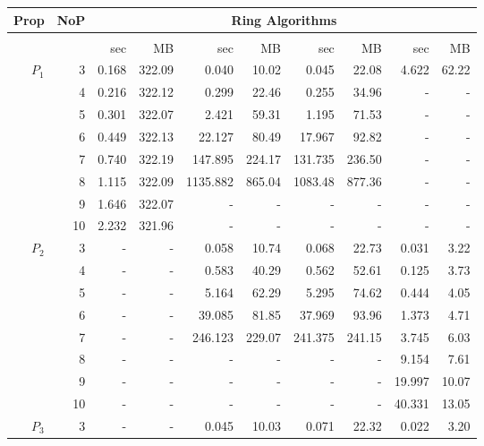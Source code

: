 \begin{figure}[h!]\scriptsize
	\centering
	\setlength{\tabcolsep}{2pt}
	\begin{tabular}{| r | r | r | r | r | r | r | r | r | r |}
		\hline
		\textbf{Prop} & \textbf{NoP} & \multicolumn{8}{c|}{Ring Algorithms} \\
		\hline
		{} & {} & \multicolumn{2}{c|}{\verds{}} & \multicolumn{2}{c|}{\nusmv{}} & \multicolumn{2}{c|}{\nuxmv{}} &  \multicolumn{2}{c|}{\sctl{}} \\
		\hline
		{} & {} & sec & MB & sec & MB & sec & MB & sec & MB \\
		\hline
		\multirow{6}{*}{$P_1$} & 3 & 0.168 & 322.09 & 0.040 & 10.02 & 0.045 & 22.08 & 4.622 & 62.22  \\
		{} & 4 & 0.216 & 322.12 & 0.299 & 22.46 & 0.255 & 34.96 & - & -  \\
		{} & 5 & 0.301 & 322.07 & 2.421 & 59.31 & 1.195 & 71.53 & - & -  \\
		{} & 6 & 0.449 & 322.13 & 22.127 & 80.49 & 17.967 & 92.82 & - & -  \\
		{} & 7 & 0.740 & 322.19 & 147.895 & 224.17 & 131.735 & 236.50 & - & -  \\
		{} & 8 & 1.115 & 322.09 & 1135.882 & 865.04 & 1083.48 & 877.36 & - & -  \\
		{} & 9 & 1.646 & 322.07 & - & - & - & - & - & -  \\
		{} & 10 & 2.232 & 321.96 & - & - & - & - & - & -  \\
		\hline
		\multirow{6}{*}{$P_2$} & 3 & - & - & 0.058 & 10.74 & 0.068 & 22.73 & 0.031 & 3.22  \\
		{} & 4 & - & - & 0.583 & 40.29 & 0.562 & 52.61 & 0.125 & 3.73  \\
		{} & 5 & - & - & 5.164 & 62.29 & 5.295 & 74.62 & 0.444 & 4.05  \\
		{} & 6 & - & - & 39.085 & 81.85 & 37.969 & 93.96 & 1.373 & 4.71  \\
		{} & 7 & - & - & 246.123 & 229.07 & 241.375 & 241.15 & 3.745 & 6.03  \\
		{} & 8 & - & - & - & - & - & - & 9.154 & 7.61  \\
		{} & 9 & - & - & - & - & - & - & 19.997 & 10.07  \\
		{} & 10 & - & - & - & - & - & - & 40.331 & 13.05  \\
		\hline
		\multirow{6}{*}{$P_3$} & 3 & - & - & 0.045 & 10.03 & 0.071 & 22.32 & 0.022 & 3.20  \\

\end{tabular}
\end{figure}
